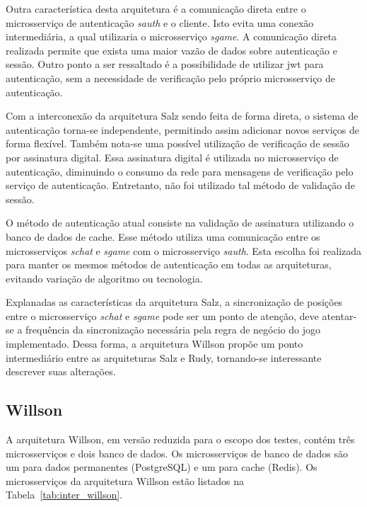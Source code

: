 Outra característica desta arquitetura é a comunicação direta entre o microsserviço de autenticação \textit{sauth} e o cliente.
%
Isto evita uma conexão intermediária, a qual utilizaria o microsserviço \textit{sgame}.
%
A comunicação direta realizada permite que exista uma maior vazão de dados sobre autenticação e sessão.
%
Outro ponto a ser ressaltado é a possibilidade de utilizar \ac{jwt} para autenticação, sem a necessidade de verificação pelo próprio microsserviço de autenticação.



Com a interconexão da arquitetura Salz sendo feita de forma direta, o sistema de autenticação torna-se independente, permitindo assim adicionar novos serviços de forma flexível.
%
Também nota-se uma possível utilização de verificação de sessão por assinatura digital.
%
Essa assinatura digital é utilizada no microsserviço de autenticação, diminuindo o consumo da rede para mensagens de verificação pelo serviço de autenticação.
%
Entretanto, não foi utilizado tal método de validação de sessão.




O método de autenticação atual consiste na validação de assinatura utilizando o banco de dados de cache.
%
Esse método utiliza uma comunicação entre os microsserviços \textit{schat} e \textit{sgame} com o microsserviço \textit{sauth}.
%
Esta escolha foi realizada para manter os mesmos métodos de autenticação em todas as arquiteturas, evitando variação de algoritmo ou tecnologia.



Explanadas as características da arquitetura Salz, a sincronização de posições entre o microsserviço \textit{schat} e \textit{sgame} pode ser um ponto de atenção, deve atentar-se a frequência da sincronização necessária pela regra de negócio do jogo implementado.
%
Dessa forma, a arquitetura Willson propõe um ponto intermediário entre as arquiteturas Salz e Rudy, tornando-se interessante descrever suas alterações.



\subsection{Willson}
\label{sec:inter_willson}


A arquitetura Willson, em versão reduzida para o escopo dos testes, contém três microsserviços e dois banco de dados.
%
Os microsserviços de banco de dados são um para dados permanentes (PostgreSQL) e um para cache (Redis).
%
Os microsserviços da arquitetura Willson estão listados na Tabela~\ref{tab:inter_willson}.



